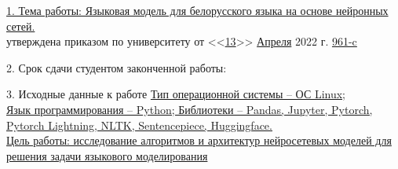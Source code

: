 {\begin{center}
  \end{center}

  \uline{\mbox{\hspace*{0.2em}}1. Тема работы: \quad Языковая модель для белорусского языка на основе нейронных сетей.\hfill\mbox{\hspace*{15.5em}}} \\
  
  утверждена приказом по университету от \hspace*{1em} <<\uline{\mbox{\hspace*{0.5em}}13\mbox{\hspace*{0.5em}}}>> \uline{\mbox{\hspace*{1em}}Апреля\mbox{\hspace*{1em}}} 2022 г.  \No \uline{\mbox{\hspace*{0.5em}}961-c\mbox{\hspace*{1em}}}

  \vspace{1em}

  \hspace*{0.2em}2. Срок сдачи студентом законченной работы: \lineunderscore

  \vspace{1em}

  \hspace*{0.2em}3. Исходные данные к работе \hspace*{1em}
  \uline{Тип операционной системы -- ОС Linux;\hfill}\\
  \uline{\mbox{\hspace*{0.2em}} Язык программирования -- Python; Библиотеки -- Pandas, Jupyter, Pytorch,\hfill}\\ \uline{\mbox{\hspace*{0.2em}} Pytorch Lightning, NLTK, Sentencepiece, Huggingface.\hfill}\\
  \uline{\mbox{\hspace*{0.2em}} Цель работы: исследование алгоритмов и архитектур нейросетевых моделей для решения задачи языкового моделирования\hfill} \\

  \vspace{1em}

}
